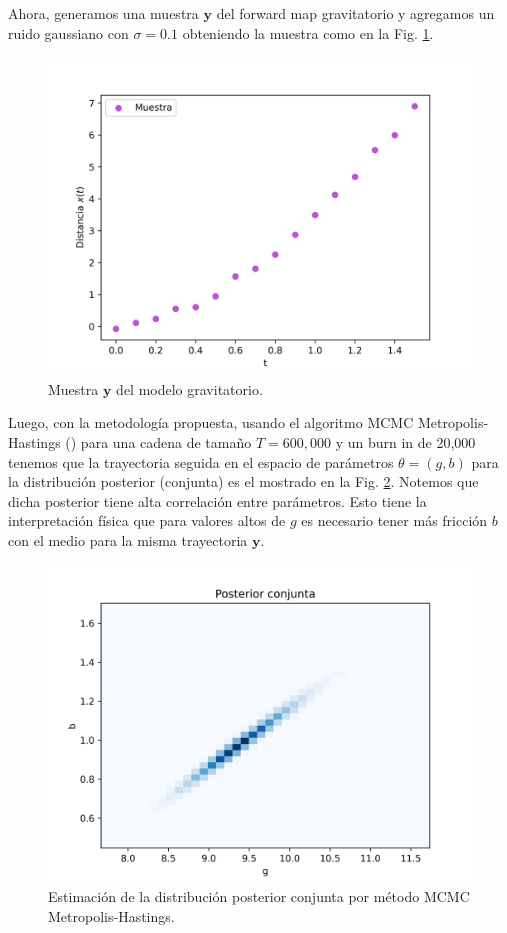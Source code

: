 Ahora, generamos una muestra $\mathbf{y}$ del forward map gravitatorio y agregamos un ruido gaussiano con $\sigma = 0.1$ obteniendo la muestra como en la Fig. \ref{Fig. 3.2.2.02}.

\begin{figure}
    \centering 
    \includegraphics[width = 10 cm ]{img/Exp_Central_gravedad_sigma/Figuras/Generales/Muestra_gravedad_sigma.png} 
    \caption{Muestra $\mathbf{y}$ del modelo gravitatorio.}
    \label{Fig. 3.2.2.02}
\end{figure} 

Luego, con la metodología propuesta, usando el algoritmo MCMC Metropolis-Hastings (\cite{christen2010general}) para una cadena de tamaño $T = 600,000$ y un burn in de 20,000 tenemos que la trayectoria seguida en el espacio de parámetros $\theta = (g,b)$ para la distribución posterior (conjunta) es el mostrado en la Fig. \ref{Fig. 3.2.2.03}. Notemos que dicha posterior tiene alta correlación entre parámetros. Esto tiene la interpretación física que para valores altos de $g$ es necesario tener más fricción $b$ con el medio para la misma trayectoria $\mathbf{y}$.

\begin{figure}
    \centering 
    \includegraphics[width = 10 cm ]{img/Exp_Central_gravedad_sigma/Figuras/Generales/Conjunta_gravedad_sigma.png} 
    \caption{Estimación de la distribución posterior conjunta por método MCMC Metropolis-Hastings.}
    \label{Fig. 3.2.2.03}
\end{figure} 

